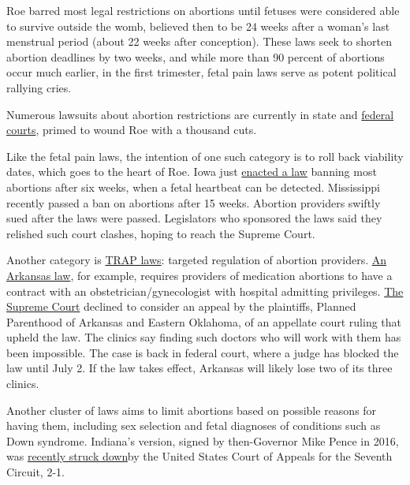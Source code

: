Roe barred most legal restrictions on abortions until fetuses were
considered able to survive outside the womb, believed then to be 24
weeks after a woman's last menstrual period (about 22 weeks after
conception). These laws seek to shorten abortion deadlines by two weeks,
and while more than 90 percent of abortions occur much earlier, in the
first trimester, fetal pain laws serve as potent political rallying
cries.

Numerous lawsuits about abortion restrictions are currently in state and
\href{https://www.texastribune.org/2018/06/14/lawsuit-challenges-texas-anti-abortion-laws-based-2013-supreme-court-r/}{federal
courts}, primed to wound Roe with a thousand cuts.

Like the fetal pain laws, the intention of one such category is to roll
back viability dates, which goes to the heart of Roe. Iowa just
\href{https://www.npr.org/sections/thetwo-way/2018/05/15/611327234/groups-file-lawsuit-to-block-iowas-new-heartbeat-abortion-law}{enacted
a law} banning most abortions after six weeks, when a fetal heartbeat
can be detected. Mississippi recently passed a ban on abortions after 15
weeks. Abortion providers swiftly sued after the laws were passed.
Legislators who sponsored the laws said they relished such court
clashes, hoping to reach the Supreme Court.

Another category is
\href{https://www.kxan.com/news/us-politics/texas/providers-activists-file-lawsuit-challenging-decades-of-texas-abortion-law/1240137484}{TRAP
laws}: targeted regulation of abortion providers.
\href{https://www.nytimes3xbfgragh.onion/2018/05/29/us/politics/supreme-court-wont-hear-challenge-to-restrictive-arkansas-abortion-law.html}{An
Arkansas law}, for example, requires providers of medication abortions
to have a contract with an obstetrician/gynecologist with hospital
admitting privileges.
\href{https://www.nytimes3xbfgragh.onion/2018/05/24/opinion/supreme-court-abortion.html}{The
Supreme Court} declined to consider an appeal by the plaintiffs, Planned
Parenthood of Arkansas and Eastern Oklahoma, of an appellate court
ruling that upheld the law. The clinics say finding such doctors who
will work with them has been impossible. The case is back in federal
court, where a judge has blocked the law until July 2. If the law takes
effect, Arkansas will likely lose two of its three clinics.

Another cluster of laws aims to limit abortions based on possible
reasons for having them, including sex selection and fetal diagnoses of
conditions such as Down syndrome. Indiana's version, signed by
then-Governor Mike Pence in 2016, was
\href{http://www.abajournal.com/news/article/7th_circuit_blocks_disability_abortion_ban_partial_dissent_labels_abortion}{recently
struck down}by the United States Court of Appeals for the Seventh
Circuit, 2-1.

